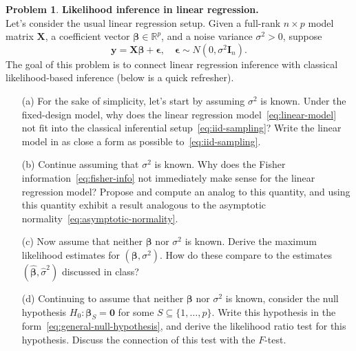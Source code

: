 \documentclass[11pt,letterpaper,english,oneside]{article} %
\theoremstyle{definition} %
\newtheorem{problem}{Problem}
\newenvironment{prob}{\clearpage \begin{problem}\hspace{0pt}}{\end{problem}}
\begin{document}
\begin{prob} \label{prob:likelihood}\textbf{Likelihood inference in linear regression.} \\

    \noindent Let's consider the usual linear regression setup. Given a full-rank $n \times p$ model matrix $\bm X$, a coefficient vector $\bm \beta \in \mathbb R^p$, and a noise variance $\sigma^2 > 0$, suppose
    \begin{equation}
    \bm y = \bm X \bm \beta + \bm \epsilon, \quad \bm \epsilon \sim N(0, \sigma^2 \bm I_n).
    \label{eq:linear-model}
    \end{equation}
    The goal of this problem is to connect linear regression inference with classical likelihood-based inference (below is a quick refresher).
    
    \begin{enumerate}
    \item[(a)] For the sake of simplicity, let's start by assuming $\sigma^2$ is known. Under the fixed-design model, why does the linear regression model~\eqref{eq:linear-model} not fit into the classical inferential setup~\eqref{eq:iid-sampling}? Write the linear model in as close a form as possible to~\eqref{eq:iid-sampling}.
    
    \item[(b)] Continue assuming that $\sigma^2$ is known. Why does the Fisher information~\eqref{eq:fisher-info} not immediately make sense for the linear regression model? Propose and compute an analog to this quantity, and using this quantity exhibit a result analogous to the asymptotic normality~\eqref{eq:asymptotic-normality}.
    
    \item[(c)] Now assume that neither $\bm{\beta}$ nor $\sigma^2$ is known. Derive the maximum likelihood estimates for $(\bm \beta, \sigma^2)$. How do these compare to the estimates $(\bm{\widehat \beta}, \widehat \sigma^2)$ discussed in class?
    
    \item[(d)] Continuing to assume that neither $\bm{\beta}$ nor $\sigma^2$ is known, consider the null hypothesis $H_0: \bm{\beta}_S = \bm 0$ for some $S \subseteq \{1, \dots, p\}$. Write this hypothesis in the form~\eqref{eq:general-null-hypothesis}, and derive the likelihood ratio test for this hypothesis. Discuss the connection of this test with the $F$-test.
    
    \end{enumerate}
    

\end{prob}
\end{document}
